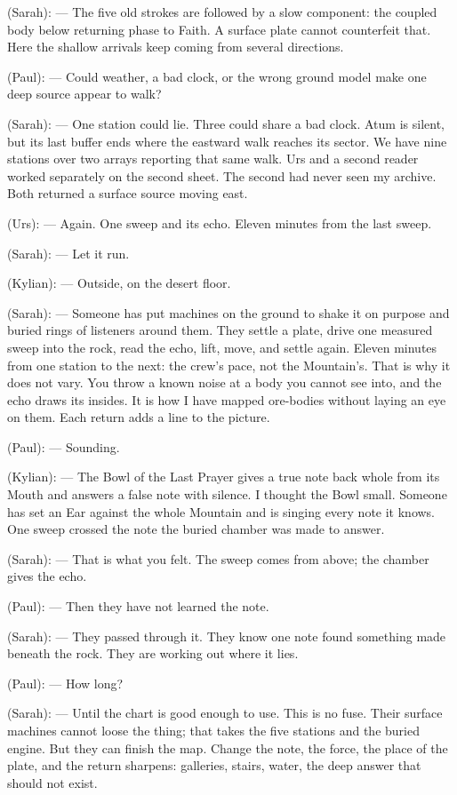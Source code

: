 \begin{room}
(Sarah): --- The five old strokes are followed by a slow component: the coupled body below returning phase to Faith. A surface plate cannot counterfeit that. Here the shallow arrivals keep coming from several directions.

(Paul): --- Could weather, a bad clock, or the wrong ground model make one deep source appear to walk?

(Sarah): --- One station could lie. Three could share a bad clock. Atum is silent, but its last buffer ends where the eastward walk reaches its sector. We have nine stations over two arrays reporting that same walk. Urs and a second reader worked separately on the second sheet. The second had never seen my archive. Both returned a surface source moving east.

(Urs): --- Again. One sweep and its echo. Eleven minutes from the last sweep.

(Sarah): --- Let it run.

(Kylian): --- Outside, on the desert floor.

(Sarah): --- Someone has put machines on the ground to shake it on purpose and buried rings of listeners around them. They settle a plate, drive one measured sweep into the rock, read the echo, lift, move, and settle again. Eleven minutes from one station to the next: the crew's pace, not the Mountain's. That is why it does not vary. You throw a known noise at a body you cannot see into, and the echo draws its insides. It is how I have mapped ore-bodies without laying an eye on them. Each return adds a line to the picture.

(Paul): --- Sounding.

(Kylian): --- The Bowl of the Last Prayer gives a true note back whole from its Mouth and answers a false note with silence. I thought the Bowl small. Someone has set an Ear against the whole Mountain and is singing every note it knows. One sweep crossed the note the buried chamber was made to answer.

(Sarah): --- That is what you felt. The sweep comes from above; the chamber gives the echo.

(Paul): --- Then they have not learned the note.

(Sarah): --- They passed through it. They know one note found something made beneath the rock. They are working out where it lies.

(Paul): --- How long?

(Sarah): --- Until the chart is good enough to use. This is no fuse. Their surface machines cannot loose the thing; that takes the five stations and the buried engine. But they can finish the map. Change the note, the force, the place of the plate, and the return sharpens: galleries, stairs, water, the deep answer that should not exist.


\end{room}
